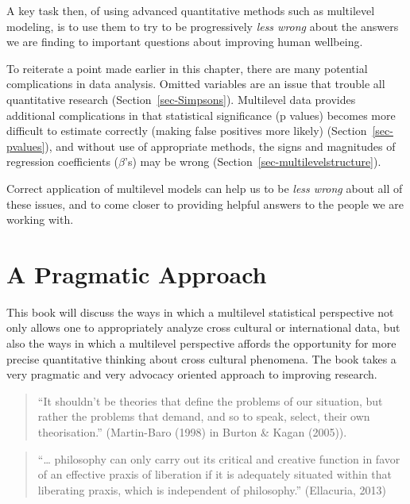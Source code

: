 \documentclass[
  letterpaper,
  DIV=11,
  numbers=noendperiod]{scrreprt}
\begin{document}
A key task then, of using advanced quantitative methods such as
multilevel modeling, is to use them to try to be progressively
\emph{less wrong} about the answers we are finding to important
questions about improving human wellbeing. 

To reiterate a point made earlier in this chapter, there are many
potential complications in data analysis. Omitted variables are an issue
that trouble all quantitative research (Section~\ref{sec-Simpsons}).
Multilevel data provides additional complications in that statistical
significance (p values) becomes more difficult to estimate correctly
(making false positives more likely) (Section~\ref{sec-pvalues}), and
without use of appropriate methods, the signs and magnitudes of
regression coefficients (\(\beta\)'s) may be wrong
(Section~\ref{sec-multilevelstructure}).

Correct application of multilevel models can help us to be \emph{less
wrong} about all of these issues, and to come closer to providing
helpful answers to the people we are working with. 

\section{A Pragmatic Approach}\label{a-pragmatic-approach}

This book will discuss the ways in which a multilevel statistical
perspective not only allows one to appropriately analyze cross cultural
or international data, but also the ways in which a multilevel
perspective affords the opportunity for more precise quantitative
thinking about cross cultural phenomena. The book takes a very pragmatic
and very advocacy oriented approach to improving research.
 

\begin{quote}
``It shouldn't be theories that define the problems of our situation,
but rather the problems that demand, and so to speak, select, their own
theorisation.'' (Martin-Baro (1998) in Burton \& Kagan (2005)).
\end{quote}

\begin{quote}
``\ldots{} philosophy can only carry out its critical and creative
function in favor of an effective praxis of liberation if it is
adequately situated within that liberating praxis, which is independent
of philosophy.'' (Ellacuria, 2013)
\end{quote}
\end{document}
